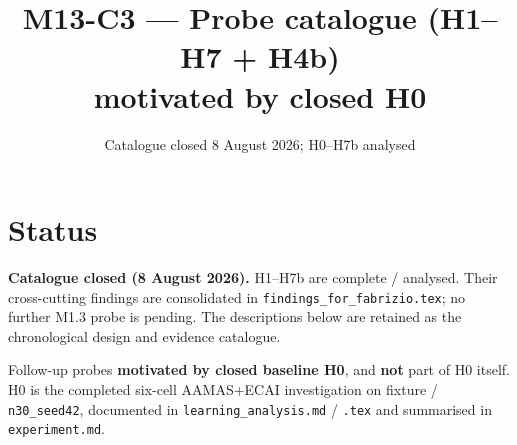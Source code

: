\documentclass[11pt]{article}
\title{M13-C3 --- Probe catalogue (H1--H7 + H4b)\\
motivated by closed H0}
\author{}
\date{Catalogue closed 8 August 2026; H0--H7b analysed}
\begin{document}
\maketitle

\section{Status}

\textbf{Catalogue closed (8 August 2026).} H1--H7b are complete / analysed.
Their cross-cutting findings are consolidated in
\texttt{findings\_for\_fabrizio.tex}; no further M1.3 probe is pending. The
descriptions below are retained as the chronological design and evidence catalogue.

{\raggedright
Follow-up probes \textbf{motivated by closed baseline H0}, and \textbf{not}
part of H0 itself.
H0 is the completed six-cell AAMAS+ECAI investigation on fixture
 / \texttt{n30\_seed42}, documented in
\texttt{learning\_analysis.md} / \texttt{.tex} and summarised in
\texttt{experiment.md}.
\par}
\end{document}
